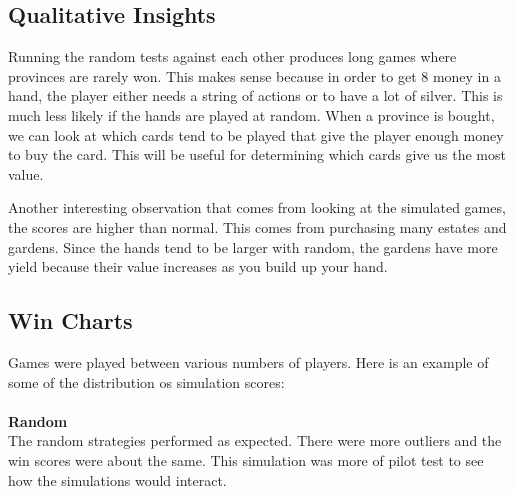 \documentclass[11pt, oneside]{article}   	%
\begin{document}
\subsection{Qualitative Insights}

Running the random tests against each other produces long games where provinces are rarely won. This makes sense because in order to get 8 money in a hand, the player either needs a string of actions or to have a lot of silver. This is much less likely if the hands are played at random. When a province is bought, we can look at which cards tend to be played that give the player enough money to buy the card. This will be useful for determining which cards give us the most value. 

Another interesting observation that comes from looking at the simulated games, the scores are higher than normal. This comes from purchasing many estates and gardens. Since the hands tend to be larger with random, the gardens have more yield because their value increases as you build up your hand.

\subsection{Win Charts}

Games were played between various numbers of players. Here is an example of some of the distribution os simulation scores: 
\\
\\
\textbf{Random} 
\\

The random strategies performed as expected. There were more outliers and the win scores were about the same. This simulation was more of pilot test to see how the simulations would interact. 
\end{document}
